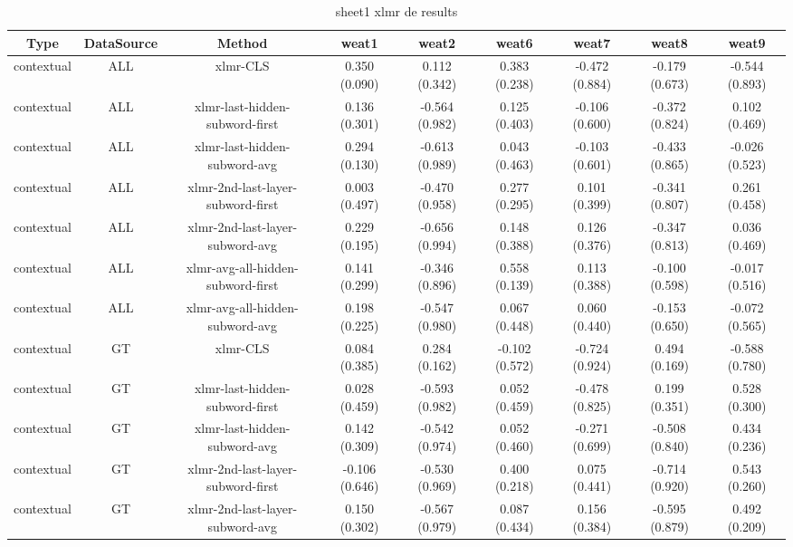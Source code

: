 \begin{sidewaystable}[htb]
    \centering
    \caption{sheet1 xlmr de results}
    \label{appendix_tab:sheet1_xlmr_de_results}
    \small
    \begin{tabular}{@{}ccccccccc@{}}
        \toprule
        Type & DataSource & Method & weat1 & weat2 & weat6 & weat7 & weat8 & weat9 \\
        \midrule
        contextual & ALL & xlmr-CLS & 0.350 (0.090) & 0.112 (0.342) & 0.383 (0.238) & -0.472 (0.884) & -0.179 (0.673) & -0.544 (0.893) \\
        contextual & ALL & xlmr-last-hidden-subword-first & 0.136 (0.301) & -0.564 (0.982) & 0.125 (0.403) & -0.106 (0.600) & -0.372 (0.824) & 0.102 (0.469) \\
        contextual & ALL & xlmr-last-hidden-subword-avg & 0.294 (0.130) & -0.613 (0.989) & 0.043 (0.463) & -0.103 (0.601) & -0.433 (0.865) & -0.026 (0.523) \\
        contextual & ALL & xlmr-2nd-last-layer-subword-first & 0.003 (0.497) & -0.470 (0.958) & 0.277 (0.295) & 0.101 (0.399) & -0.341 (0.807) & 0.261 (0.458) \\
        contextual & ALL & xlmr-2nd-last-layer-subword-avg & 0.229 (0.195) & -0.656 (0.994) & 0.148 (0.388) & 0.126 (0.376) & -0.347 (0.813) & 0.036 (0.469) \\
        contextual & ALL & xlmr-avg-all-hidden-subword-first & 0.141 (0.299) & -0.346 (0.896) & 0.558 (0.139) & 0.113 (0.388) & -0.100 (0.598) & -0.017 (0.516) \\
        contextual & ALL & xlmr-avg-all-hidden-subword-avg & 0.198 (0.225) & -0.547 (0.980) & 0.067 (0.448) & 0.060 (0.440) & -0.153 (0.650) & -0.072 (0.565) \\
        contextual & GT & xlmr-CLS & 0.084 (0.385) & 0.284 (0.162) & -0.102 (0.572) & -0.724 (0.924) & 0.494 (0.169) & -0.588 (0.780) \\
        contextual & GT & xlmr-last-hidden-subword-first & 0.028 (0.459) & -0.593 (0.982) & 0.052 (0.459) & -0.478 (0.825) & 0.199 (0.351) & 0.528 (0.300) \\
        contextual & GT & xlmr-last-hidden-subword-avg & 0.142 (0.309) & -0.542 (0.974) & 0.052 (0.460) & -0.271 (0.699) & -0.508 (0.840) & 0.434 (0.236) \\
        contextual & GT & xlmr-2nd-last-layer-subword-first & -0.106 (0.646) & -0.530 (0.969) & 0.400 (0.218) & 0.075 (0.441) & -0.714 (0.920) & 0.543 (0.260) \\
        contextual & GT & xlmr-2nd-last-layer-subword-avg & 0.150 (0.302) & -0.567 (0.979) & 0.087 (0.434) & 0.156 (0.384) & -0.595 (0.879) & 0.492 (0.209) \\

\end{tabular}
\end{sidewaystable}
